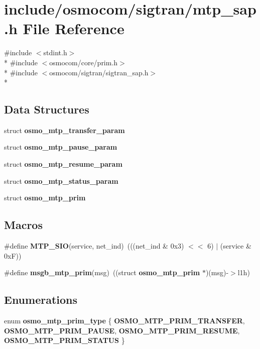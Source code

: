 \section{include/osmocom/sigtran/mtp\+\_\+sap.h File Reference}
\label{mtp__sap_8h}
{\ttfamily \#include $<$stdint.\+h$>$}\\*
{\ttfamily \#include $<$osmocom/core/prim.\+h$>$}\\*
{\ttfamily \#include $<$osmocom/sigtran/sigtran\+\_\+sap.\+h$>$}\\*
\subsection*{Data Structures}
\begin{DoxyCompactItemize}
\item 
struct {\bf osmo\+\_\+mtp\+\_\+transfer\+\_\+param}
\item 
struct {\bf osmo\+\_\+mtp\+\_\+pause\+\_\+param}
\item 
struct {\bf osmo\+\_\+mtp\+\_\+resume\+\_\+param}
\item 
struct {\bf osmo\+\_\+mtp\+\_\+status\+\_\+param}
\item 
struct {\bf osmo\+\_\+mtp\+\_\+prim}
\end{DoxyCompactItemize}
\subsection*{Macros}
\begin{DoxyCompactItemize}
\item 
\#define {\bf M\+T\+P\+\_\+\+S\+IO}(service,  net\+\_\+ind)~(((net\+\_\+ind \& 0x3) $<$$<$ 6) $\vert$ (service \& 0x\+F))
\item 
\#define {\bf msgb\+\_\+mtp\+\_\+prim}(msg)~((struct {\bf osmo\+\_\+mtp\+\_\+prim} $\ast$)(msg)-\/$>$l1h)
\end{DoxyCompactItemize}
\subsection*{Enumerations}
\begin{DoxyCompactItemize}
\item 
enum {\bf osmo\+\_\+mtp\+\_\+prim\+\_\+type} \{ {\bf O\+S\+M\+O\+\_\+\+M\+T\+P\+\_\+\+P\+R\+I\+M\+\_\+\+T\+R\+A\+N\+S\+F\+ER}, 
{\bf O\+S\+M\+O\+\_\+\+M\+T\+P\+\_\+\+P\+R\+I\+M\+\_\+\+P\+A\+U\+SE}, 
{\bf O\+S\+M\+O\+\_\+\+M\+T\+P\+\_\+\+P\+R\+I\+M\+\_\+\+R\+E\+S\+U\+ME}, 
{\bf O\+S\+M\+O\+\_\+\+M\+T\+P\+\_\+\+P\+R\+I\+M\+\_\+\+S\+T\+A\+T\+US}
 \}
\end{DoxyCompactItemize}
